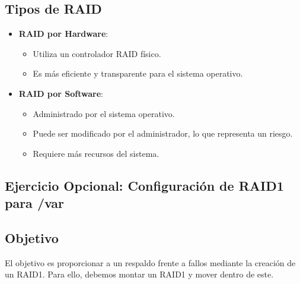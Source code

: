 \subsection{Tipos de RAID}
\begin{itemize}
    \item \textbf{RAID por Hardware}: 
    \begin{itemize}
        \item Utiliza un controlador RAID físico.
        \item Es más eficiente y transparente para el sistema operativo.
    \end{itemize}
    
    \item \textbf{RAID por Software}: 
    \begin{itemize}
        \item Administrado por el sistema operativo.
        \item Puede ser modificado por el administrador, lo que representa un riesgo.
        \item Requiere más recursos del sistema.
    \end{itemize}
\end{itemize}

\subsection{Ejercicio Opcional: Configuración de RAID1 para /var}

\subsection{Objetivo}
El objetivo es proporcionar a  un respaldo frente a fallos mediante la creación de un RAID1. Para ello, debemos montar un RAID1 y mover  dentro de este.

